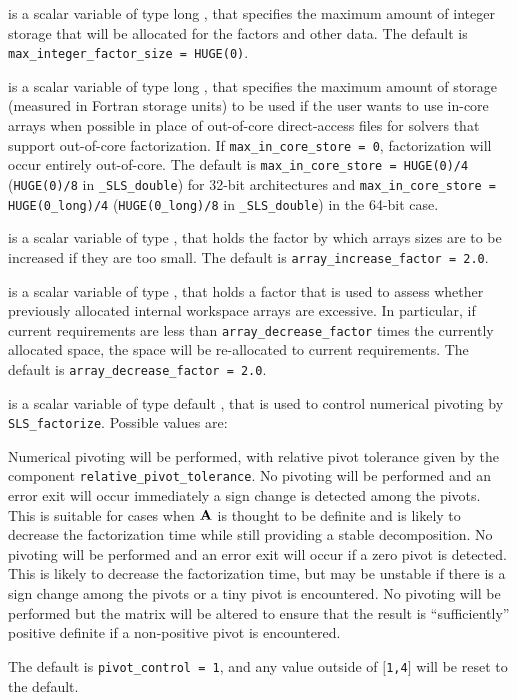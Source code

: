 \documentclass{galahad}
\newcommand{\packagename}{SLS}
\newcommand{\fullpackagename}{\libraryname\_\-\packagename}
\begin{document}
\begin{description}
 is a scalar variable of type long \integer,
that specifies the maximum amount of integer storage that will be
allocated for the factors and other data.
The default is {\tt max\_integer\_factor\_size = HUGE(0)}.

 is a scalar variable of type long \integer,
that specifies the maximum amount of storage (measured in Fortran storage units)
to be used if the user wants to use in-core arrays when possible in place of
out-of-core direct-access files for solvers that support out-of-core
factorization. If {\tt max\_in\_core\_store = 0}, factorization will
occur entirely out-of-core.
The default is {\tt max\_in\_core\_store = HUGE(0)/4}
({\tt HUGE(0)/8} in {\tt \fullpackagename\-\_\-double})
for 32-bit architectures and
{\tt max\_in\_core\_store = HUGE(0\_long)/4}
({\tt HUGE(0\_long)/8}
in {\tt \fullpackagename\-\_\-double})
in the 64-bit case.

 is a scalar variable of type \realdp, that holds
the factor by which arrays sizes are to be increased if they are too small.
The default is {\tt array\_increase\_factor = 2.0}.

 is a scalar variable of type \realdp, that holds
a factor that is used to assess whether previously allocated internal
workspace arrays are excessive. In particular, if current requirements are
less than {\tt array\_decrease\_factor} times the currently allocated space,
the space will be re-allocated to current requirements.
The default is {\tt array\_decrease\_factor = 2.0}.

 is a scalar variable of type default \integer,
that is used to control numerical pivoting by {\tt \packagename\_\-factorize}.
Possible values are:
\begin{description}
   Numerical pivoting will be performed, with relative pivot
     tolerance given by the component {\tt relative\_\-pivot\_tolerance}.
   No pivoting will be performed and an error exit will occur
     immediately a sign change is detected among the pivots. This is
     suitable for cases when ${\mathbf{A}}$  is thought to be definite and is likely to
     decrease the factorization time while still providing a stable
     decomposition.
   No pivoting will be performed and an error exit will occur if a
     zero pivot is detected. This is likely to decrease the factorization
     time, but may be unstable if there is a sign change among the pivots
     or a tiny pivot is encountered.
   No pivoting will be performed but the matrix will be altered
     to ensure that the result is ``sufficiently'' positive definite
     if a non-positive pivot is encountered.
\end{description}
The default is {\tt pivot\_control = 1}, and any value outside of
$[${\tt1,4}$]$ will be reset to the default.


\end{description}
\end{document}
